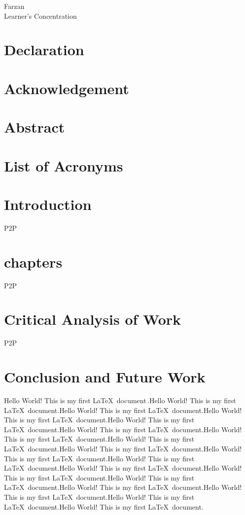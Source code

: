 \documentclass[12pt]{article}
\newcommand\frontmatter{
\cleardoublepage
\pagenumbering{roman}}
\newcommand\mainmatter{\cleardoublepage
\pagenumbering{arabic}}
\begin{document}
\begin{titlepage}
\raggedright
{\Large Farzan \\}
{\Large Learner's Concentration \\}
\end{titlepage}

\frontmatter
\begin{multicols}{2}
\section*{Declaration}
\section*{Acknowledgement}
\section*{Abstract}
\end{multicols}
\newpage
\tableofcontents
\listoffigures
\listoftables
\section*{List of Acronyms}

\mainmatter
\begin{multicols}{2}
\section{Introduction}
\ac{P2P}
\section{chapters}
\acf{P2P}
\section{Critical Analysis of Work}
\ac{P2P}
\section{Conclusion and Future Work}
Hello World! This is my first \LaTeX\ document\,\citet{marouane2015towards}.Hello World! This is my first \LaTeX\ document.Hello World! This is my first \LaTeX\ document.Hello World! This is my first \LaTeX\ document.Hello World! This is my first \LaTeX\ document.Hello World! This is my first \LaTeX\ document.Hello World! This is my first \LaTeX\ document.Hello World! This is my first \LaTeX\ document.Hello World! This is my first \LaTeX\ document.Hello World! This is my first \LaTeX\ document.Hello World! This is my first \LaTeX\ document.Hello World! This is my first \LaTeX\ document.Hello World! This is my first \LaTeX\ document.Hello World! This is my first \LaTeX\ document.Hello World! This is my first \LaTeX\ document.Hello World! This is my first \LaTeX\ document.Hello World! This is my first \LaTeX\ document.Hello World! This is my first \LaTeX\ document.\citep{marouane2015towards}
\end{multicols}


\clearpage
{}
\printindex
\end{document}
